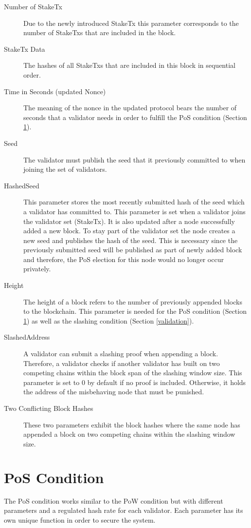 \begin{description}
	\item[Number of StakeTx] Due to the newly introduced StakeTx this parameter corresponds to the number of StakeTxs that are included in the block.
	\item[StakeTx Data] The hashes of all StakeTxs that are included in this block in sequential order.
	\item[Time in Seconds (updated Nonce)] The meaning of the nonce in the updated protocol bears the number of seconds that a validator needs in order to fulfill the PoS condition (Section \ref{pos-condition}).
	\item[Seed] The validator must publish the seed that it previously committed to when joining the set of validators.
	\item[HashedSeed] This parameter stores the most recently submitted hash of the seed which a validator has committed to. This parameter is set when a validator joins the validator set (StakeTx). It is also updated after a node successfully added a new block. To stay part of the validator set the node creates a new seed and publishes the hash of the seed. This is necessary since the previously submitted seed will be published as part of newly added block and therefore, the PoS election for this node would no longer occur privately. 
	\item[Height] The height of a block refers to the number of previously appended blocks to the blockchain. This parameter is needed for the PoS condition (Section \ref{pos-condition}) as well as the slashing condition (Section \ref{validation}).
	\item[SlashedAddress] A validator can submit a slashing proof when appending a block. Therefore, a validator checks if another validator has built on two competing chains within the block span of the slashing window size. This parameter is set to 0 by default if no proof is included. Otherwise, it holds the address of the misbehaving node that must be punished.
	\item[Two Conflicting Block Hashes] These two parameters exhibit the block hashes where the same node has appended a block on two competing chains within the slashing window size. 
\end{description}


\section{PoS Condition}\label{pos-condition}
The PoS condition works similar to the PoW condition but with different parameters and a regulated hash rate for each validator. Each parameter has its own unique function in order to secure the system. 

